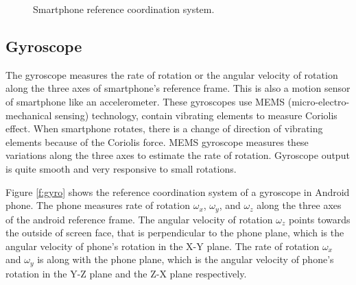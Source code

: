 \begin{figure}[!ht]
\centering
{}
\hfill
{}

\caption{Smartphone reference coordination system.}
\label{f:coord_dia}
\end{figure}

\subsection{Gyroscope}
The gyroscope measures the rate of rotation or the angular velocity of rotation along the three axes of smartphone's reference frame.
This is also a motion sensor of smartphone like an accelerometer.
These gyroscopes use MEMS (micro-electro-mechanical sensing) technology, contain vibrating elements to measure Coriolis effect.
When smartphone rotates, there is a change of direction of vibrating elements because of the Coriolis force.
MEMS gyroscope measures these variations along the three axes to estimate the rate of rotation.
Gyroscope output is quite smooth and very responsive to small rotations.

Figure \ref{f:gyro} shows the reference coordination system of a gyroscope in Android phone.
The phone measures rate of rotation $\omega_x$, $\omega_y$, and $\omega_z$ along the three axes of the android reference frame.
The angular velocity of rotation $\omega_z$ points towards the outside of screen face, that is perpendicular to the phone plane, which is the angular velocity of phone's rotation in the X-Y plane.
The rate of rotation $\omega_x$ and $\omega_y$ is along with the phone plane, which is the angular velocity of phone's rotation in the Y-Z plane and the Z-X plane respectively.

